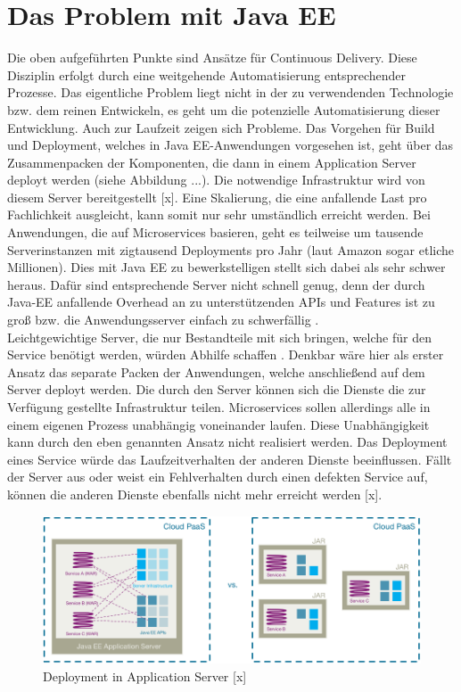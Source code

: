 \section{Das Problem mit Java EE}
Die oben aufgeführten Punkte sind Ansätze für Continuous Delivery. Diese Disziplin erfolgt durch eine weitgehende Automatisierung entsprechender Prozesse. Das eigentliche Problem liegt nicht in der zu verwendenden Technologie bzw. dem reinen Entwickeln, es geht um die potenzielle Automatisierung dieser Entwicklung. Auch zur Laufzeit zeigen sich Probleme. Das Vorgehen für Build und Deployment, welches in Java EE-Anwendungen vorgesehen ist, geht über das Zusammenpacken der Komponenten, die dann in einem Application Server deployt werden (siehe Abbildung ...). Die notwendige Infrastruktur wird von diesem Server bereitgestellt [x]. Eine Skalierung, die eine anfallende Last pro Fachlichkeit ausgleicht, kann somit nur sehr umständlich erreicht werden. Bei Anwendungen, die auf Microservices basieren, geht es teilweise um tausende Serverinstanzen mit zigtausend Deployments pro Jahr (laut Amazon sogar etliche Millionen). Dies mit Java EE zu bewerkstelligen stellt sich dabei als sehr schwer heraus. Dafür sind entsprechende Server nicht schnell genug, denn der durch Java-EE anfallende Overhead an zu unterstützenden APIs und Features ist zu groß bzw. die Anwendungsserver einfach zu schwerfällig  \cite{jaxcenter.2016}. \\ 
Leichtgewichtige Server, die nur Bestandteile mit sich bringen, welche für den Service benötigt werden, würden Abhilfe schaffen \cite{jaxcenter.2016}. Denkbar wäre hier als erster Ansatz das separate Packen der Anwendungen, welche anschließend auf dem Server deployt werden. Die durch den Server können sich die Dienste die zur Verfügung gestellte Infrastruktur teilen. Microservices sollen allerdings alle in einem eigenen Prozess unabhängig voneinander laufen. Diese Unabhängigkeit kann durch den eben genannten Ansatz nicht realisiert werden. Das Deployment eines Service würde das Laufzeitverhalten der anderen Dienste beeinflussen. Fällt der Server aus oder weist ein Fehlverhalten durch einen defekten Service auf, können die anderen Dienste ebenfalls nicht mehr erreicht werden [x].\\
\begin{figure}[h!]
	\centering
	\includegraphics[width=1.0\linewidth]{images/mp}
	\caption{Deployment in Application Server [x]}
	\label{fig:mp1}
\end{figure}

